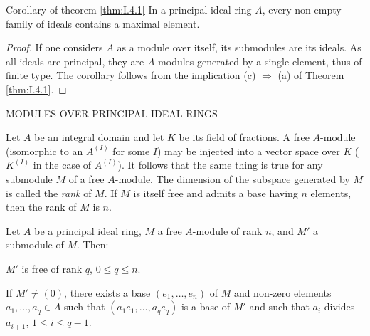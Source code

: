 \begin{statement}{Corollary of theorem \ref{thm:I.4.1}}
In a principal ideal ring $A$, every non-empty family of ideals contains a
maximal element.
\end{statement}

\begin{proof}
If one considers $A$ as a module over itself, its submodules are its ideals.
As all ideals are principal, they are $A$-modules generated by a single
element, thus of finite type. The corollary follows from the implication
(c) $\Rightarrow$ (a) of Theorem \ref{thm:I.4.1}.
\end{proof}

%
        {MODULES OVER PRINCIPAL IDEAL RINGS}

Let $A$ be an integral domain and let $K$ be its field of fractions. A free
$A$-module (isomorphic to an $A^{(I)}$ for some $I$) may be injected into a
vector space over $K$ ($K^{(I)}$ in the case of $A^{(I)}$). It follows that
the same thing is true for any submodule $M$ of a free $A$-module. The
dimension of the subspace generated by $M$ is called the \emph{rank} of $M$.
If $M$ is itself free and admits a base having $n$ elements, then the rank
of $M$ is $n$.

\begin{theorem}
\label{thm:I.5.1}
Let $A$ be a principal ideal ring, $M$ a free $A$-module of rank $n$, and
$M'$ a submodule of $M$. Then:
\begin{alist}
\item $M'$ is free of rank $q$, $0\leq q\leq n$.
\item If $M'\neq(0)$, there exists a base $(e_{1},\ldots,e_{n})$ of $M$ and
non-zero elements $a_{1},\ldots,a_{q}\in A$ such that
$(a_{1}e_{1},\ldots,a_{q}e_{q})$ is a base of $M'$ and such that $a_{i}$
divides $a_{i+1}$, $1\leq i\leq q-1$.
\end{alist}
\end{theorem}

